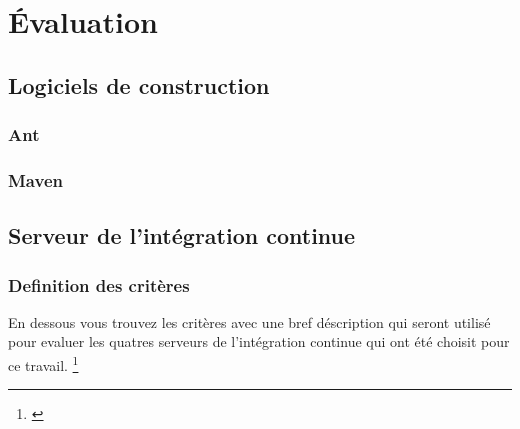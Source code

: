 \chapter{Évaluation}
\label{eval}

\section{Logiciels de construction}

\subsection{Ant}

\subsection{Maven}

\section{Serveur de l'intégration continue}

\subsection{Definition des critères}

En dessous vous trouvez les critères avec une bref déscription qui seront utilisé pour evaluer les quatres serveurs de l'intégration continue qui ont été choisit pour ce travail. \footnote{\cite{ibmciserver}}

